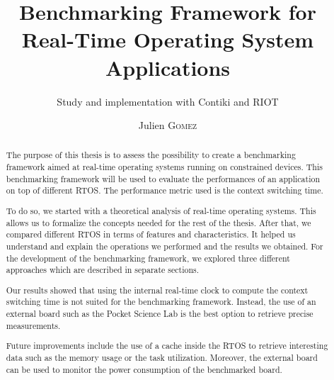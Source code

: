 \documentclass{EPL-master-thesis-covers-EN}
\title{Benchmarking Framework for Real-Time Operating System Applications}
\subtitle{Study and implementation with Contiki and RIOT}
\author{Julien \textsc{Gomez}}
\begin{document}
  \maketitle

\cleardoublepage
{}

 \begin{abstract}

    The purpose of this thesis is to assess the possibility to create a benchmarking framework aimed at 
      real-time operating systems running on constrained devices. 
    This benchmarking framework will be used to evaluate the performances of an application on top of different RTOS.
    The performance metric used is the context switching time.

    To do so, we started with a theoretical analysis of real-time operating systems.
    This allows us to formalize the concepts needed for the rest of the thesis.
    After that, we compared different RTOS in terms of features and characteristics.
    It helped us understand and explain the operations we performed and the results we obtained.
    For the development of the benchmarking framework, we explored three different approaches which are described in separate sections.
    
    Our results showed that using the internal real-time clock to compute the context switching time is not suited for the benchmarking framework.
    Instead, the use of an external board such as the Pocket Science Lab is the best option to retrieve precise measurements.

    Future improvements include the use of a cache inside the RTOS to retrieve interesting data such as the memory usage or the task utilization.
    Moreover, the external board can be used to monitor the power consumption of the benchmarked board.
    
 \end{abstract}
\end{document}

